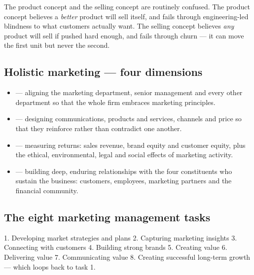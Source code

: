 \documentclass{MMTextbook}
\begin{document}
\begin{warnbox}
The product concept and the selling concept are routinely confused. The product
concept believes a \emph{better} product will sell itself, and fails through
engineering-led blindness to what customers actually want. The selling concept
believes \emph{any} product will sell if pushed hard enough, and fails through
churn --- it can move the first unit but never the second.
\end{warnbox}

\subsection{Holistic marketing --- four dimensions}

\begin{itemize}
\item {} --- aligning the marketing department, senior
      management and every other department so that the whole firm embraces
      marketing principles.
\item {} --- designing communications, products and
      services, channels and price so that they reinforce rather than
      contradict one another.
\item {} --- measuring returns: sales revenue, brand
      equity and customer equity, plus the ethical, environmental, legal and
      social effects of marketing activity.
\item {} --- building deep, enduring relationships
      with the four constituents who sustain the business: customers,
      employees, marketing partners and the financial community.
\end{itemize}

\subsection{The eight marketing management tasks}

\begin{frameworkbox}
1. Developing market strategies and plans \ra{} 2. Capturing marketing insights
\ra{} 3. Connecting with customers \ra{} 4. Building strong brands \ra{}
5. Creating value \ra{} 6. Delivering value \ra{} 7. Communicating value \ra{}
8. Creating successful long-term growth --- which loops back to task 1.
\end{frameworkbox}
\end{document}
